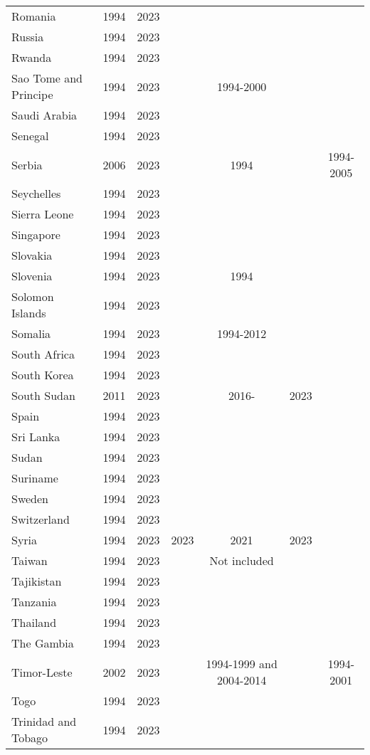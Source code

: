 {\begin{longtable}{lcccccc}
Romania & 1994 & 2023 &  &  &  & \\
Russia & 1994 & 2023 &  &  &  & \\
Rwanda & 1994 & 2023 &  &  &  & \\
Sao Tome and Principe & 1994 & 2023 &  & 1994-2000 &  & \\
\addlinespace
Saudi Arabia & 1994 & 2023 &  &  &  & \\
Senegal & 1994 & 2023 &  &  &  & \\
Serbia & 2006 & 2023 &  & 1994 &  & 1994-2005\\
Seychelles & 1994 & 2023 &  &  &  & \\
Sierra Leone & 1994 & 2023 &  &  &  & \\
\addlinespace
Singapore & 1994 & 2023 &  &  &  & \\
Slovakia & 1994 & 2023 &  &  &  & \\
Slovenia & 1994 & 2023 &  & 1994 &  & \\
Solomon Islands & 1994 & 2023 &  &  &  & \\
Somalia & 1994 & 2023 &  & 1994-2012 &  & \\
\addlinespace
South Africa & 1994 & 2023 &  &  &  & \\
South Korea & 1994 & 2023 &  &  &  & \\
South Sudan & 2011 & 2023 &  & 2016- & 2023 & \\
Spain & 1994 & 2023 &  &  &  & \\
Sri Lanka & 1994 & 2023 &  &  &  & \\
\addlinespace
Sudan & 1994 & 2023 &  &  &  & \\
Suriname & 1994 & 2023 &  &  &  & \\
Sweden & 1994 & 2023 &  &  &  & \\
Switzerland & 1994 & 2023 &  &  &  & \\
Syria & 1994 & 2023 & 2023 & 2021 & 2023 & \\
\addlinespace
Taiwan & 1994 & 2023 &  & Not included &  & \\
Tajikistan & 1994 & 2023 &  &  &  & \\
Tanzania & 1994 & 2023 &  &  &  & \\
Thailand & 1994 & 2023 &  &  &  & \\
The Gambia & 1994 & 2023 &  &  &  & \\
\addlinespace
Timor-Leste & 2002 & 2023 &  & 1994-1999 and 2004-2014 &  & 1994-2001\\
Togo & 1994 & 2023 &  &  &  & \\
Trinidad and Tobago & 1994 & 2023 &  &  &  & \\

\end{longtable}}
